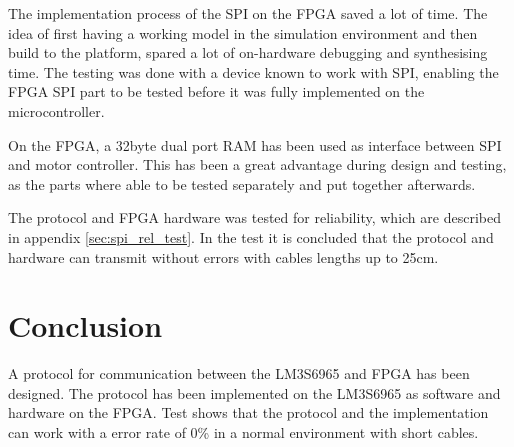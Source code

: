 The implementation process of the SPI on the FPGA saved a lot of time. The idea of first having a working model in the simulation environment and then build to the platform, spared a lot of on-hardware debugging and synthesising time. The testing was done with a device known to work with SPI, enabling the FPGA SPI part to be tested before it was fully implemented on the microcontroller.

On the FPGA, a 32byte dual port RAM has been used as interface between SPI and motor controller. This has been a great advantage during design and testing, as the parts where able to be tested separately and put together afterwards.

The protocol and FPGA hardware was tested for reliability, which are described in appendix \ref{sec:spi_rel_test}. In the test it is concluded that the protocol and hardware can transmit without errors with cables lengths up to 25cm.


\section{Conclusion}
A protocol for communication between the LM3S6965 and FPGA has been designed. The protocol has been implemented on the LM3S6965 as software and hardware on the FPGA. Test shows that the protocol and the implementation can work with a error rate of 0\% in a normal environment with short cables.


